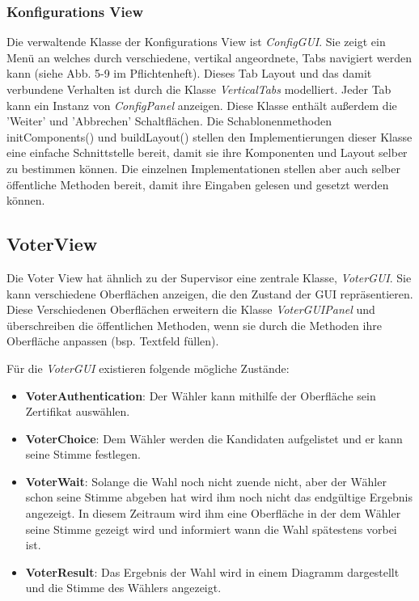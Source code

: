 \documentclass[parskip=full]{scrartcl}
\newcommand{\fakeparagraph}[1]{\textbf{#1}}
\begin{document}
		\subsubsection{Konfigurations View}
		Die verwaltende Klasse der Konfigurations View ist \textit{ConfigGUI}. Sie zeigt ein Menü an welches durch verschiedene, vertikal angeordnete, Tabs navigiert werden kann (siehe Abb. 5-9 im Pflichtenheft). Dieses Tab Layout und das damit verbundene Verhalten ist durch die Klasse \textit{VerticalTabs} modelliert. Jeder Tab kann ein Instanz von \textit{ConfigPanel} anzeigen. Diese Klasse enthält außerdem die 'Weiter' und 'Abbrechen' Schaltflächen. Die Schablonenmethoden initComponents() und buildLayout() stellen den Implementierungen dieser Klasse eine einfache Schnittstelle bereit, damit sie ihre Komponenten und Layout selber zu bestimmen können. Die einzelnen Implementationen stellen aber auch selber öffentliche Methoden bereit, damit ihre Eingaben gelesen und gesetzt werden können.
		
		\subsection{VoterView}
		Die Voter View hat ähnlich zu der Supervisor eine zentrale Klasse, \textit{VoterGUI}. Sie kann verschiedene Oberflächen anzeigen, die den Zustand der GUI repräsentieren. Diese Verschiedenen Oberflächen erweitern die Klasse \textit{VoterGUIPanel} und überschreiben die öffentlichen Methoden, wenn sie durch die Methoden ihre Oberfläche anpassen (bsp. Textfeld füllen).
		
		Für die \textit{VoterGUI} existieren folgende mögliche Zustände:
		\begin{itemize}
			\item\fakeparagraph{VoterAuthentication}: Der Wähler kann mithilfe der Oberfläche sein Zertifikat auswählen.
			\item\fakeparagraph{VoterChoice}: Dem Wähler werden die Kandidaten aufgelistet und er kann seine Stimme festlegen.
			\item\fakeparagraph{VoterWait}: Solange die Wahl noch nicht zuende nicht, aber der Wähler schon seine Stimme abgeben hat wird ihm noch nicht das endgültige Ergebnis angezeigt. In diesem Zeitraum wird ihm eine Oberfläche in der dem Wähler seine Stimme gezeigt wird und informiert wann die Wahl spätestens vorbei ist.
			\item\fakeparagraph{VoterResult}: Das Ergebnis der Wahl wird in einem Diagramm dargestellt und die Stimme des Wählers angezeigt.
		\end{itemize}
	
\end{document}

